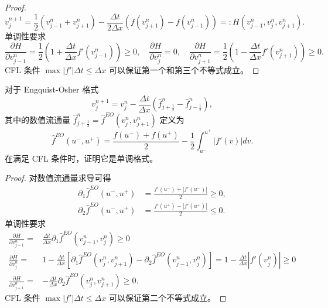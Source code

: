\begin{proof}
    \[
        v_j^{n+1} = \frac12 (v_{j-1}^n + v_{j+1}^n)
        - \frac{\Delta t}{2\Delta x} \left(f(v_{j+1}^n)-f(v_{j-1}^n)\right)  =:   H(v_{j-1}^n,v_j^n,v_{j+1}^n).
    \]
    单调性要求
    \[
        \frac{\partial H}{\partial v^n_{j-1}} ={}  \frac12(1 + \frac{\Delta t}{\Delta x}f'(v^n_{j-1}))
        \ge 0 ,\quad
        \frac{\partial H}{\partial v^n_{j}} ={}  0       ,\quad
        \frac{\partial H}{\partial v^n_{j+1}} ={} \frac12(1 - \frac{\Delta t}{\Delta x}f'(v^n_{j+1}))
        \ge 0.
    \]
    CFL 条件 $\max |f'| \Delta t \le \Delta x$ 可以保证第一个和第三个不等式成立。
\end{proof}


\begin{example}
    对于 Engquist-Osher 格式
    \[
        v_j^{n+1} = v_j^n - \frac{\Delta t}{\Delta x}\left( \hat{f}_{j+\frac12}^n - \hat{f}_{j-\frac12}^n \right),
    \]
    其中的数值流通量 $\hat{f}_{j+\frac12}^n = \hat{f}^{EO}(v_j^n,v_{j+1}^n)$ 定义为
    \[
        \hat{f}^{EO}(u^-,u^+) = \frac{f(u^-) + f(u^+)}2 - \frac12 \int_{u^-}^{u^+} |f'(v)| dv.
    \]
    在满足 CFL 条件时，证明它是单调格式。
\end{example}

\begin{proof}
    对数值流通量求导可得
    \begin{align*}
        \partial_1 \hat{f}^{EO}(u^-,u^+) & = \frac{f'(u^-) + |f'(u^-)|}2 \ge 0, \\
        \partial_2 \hat{f}^{EO}(u^-,u^+) & = \frac{f'(u^+) - |f'(u^+)|}2 \le 0.
    \end{align*}
    单调性要求
    \begin{align*}
        \frac{\partial H}{\partial v^n_{j-1}} ={} & \frac{\Delta t}{\Delta x} \partial_1 \hat{f}^{EO}(v_{j-1}^n,v^n_{j}) \ge 0   \\
        \frac{\partial H}{\partial v^n_{j}} ={}   & 1 - \frac{\Delta t}{\Delta x}
        \left[
            \partial_1 \hat{f}^{EO}(v_{j}^n,v^n_{j+1}) - \partial_2 \hat{f}^{EO}(v_{j-1}^n,v^n_{j})
        \right]  = 1 - \frac{\Delta t}{\Delta x} |f'(v_j^n)| \ge 0                                                               \\
        \frac{\partial H}{\partial v^n_{j+1}} ={} & - \frac{\Delta t}{\Delta x} \partial_2 \hat{f}^{EO}(v_{j}^n,v^n_{j+1}) \ge 0.
    \end{align*}
    CFL 条件 $\max |f'| \Delta t \le \Delta x$ 可以保证第二个不等式成立。
\end{proof}

